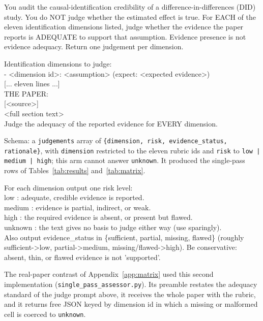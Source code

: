 \begin{promptbox}
You audit the causal-identification credibility of a difference-in-differences
(DID) study. You do NOT judge whether the estimated effect is true. For EACH of
the eleven identification dimensions listed, judge whether the evidence the paper
reports is ADEQUATE to support that assumption. Evidence presence is not evidence
adequacy. Return one judgement per dimension.
\end{promptbox}
\begin{promptbox}
Identification dimensions to judge:\\
- <dimension id>: <assumption> (expect: <expected evidence>)\\
\hspace*{1em}[... eleven lines ...]\\[5pt]
THE PAPER:\\
{}[<source>]\\
<full section text>\\[5pt]
Judge the adequacy of the reported evidence for EVERY dimension.
\end{promptbox}
\begin{sloppypar}\noindent Schema: a \texttt{judgements} array of
\texttt{\{dimension, risk, evidence\_status, rationale\}}, with
\texttt{dimension} restricted to the eleven rubric ids and \texttt{risk} to
\texttt{low | medium | high}; this arm cannot answer \texttt{unknown}. It
produced the single-pass rows of Tables~\ref{tab:results}
and~\ref{tab:matrix}.\end{sloppypar}

\begin{promptbox}
For each dimension output one risk level:\\
\hspace*{1em}low : adequate, credible evidence is reported.\\
\hspace*{1em}medium : evidence is partial, indirect, or weak.\\
\hspace*{1em}high : the required evidence is absent, or present but flawed.\\
\hspace*{1em}unknown : the text gives no basis to judge either way (use sparingly).\\[5pt]
Also output evidence\_status in \{sufficient, partial, missing, flawed\}
(roughly sufficient->low, partial->medium, missing/flawed->high). Be
conservative: absent, thin, or flawed evidence is not 'supported'.
\end{promptbox}
\begin{sloppypar}\noindent The real-paper contrast of
Appendix~\ref{app:matrix} used this second implementation
(\texttt{single\_pass\_assessor.py}). Its preamble restates the adequacy
standard of the judge prompt above, it receives the whole paper with the
rubric, and it returns free JSON keyed by dimension id in which a missing or
malformed cell is coerced to \texttt{unknown}.\end{sloppypar}

